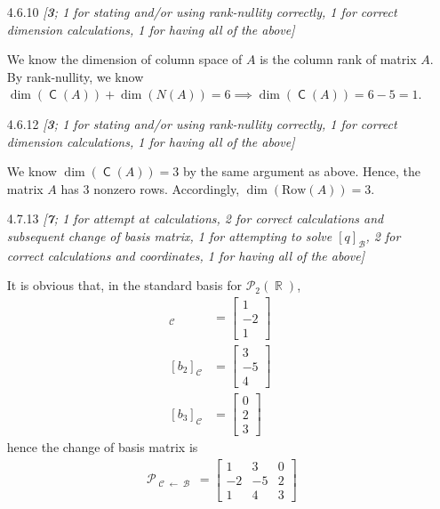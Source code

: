 \documentclass{amsart}
\theoremstyle{definition}
\theoremstyle{definition}
\DeclareMathOperator{\R}{\mathbb{R}}
\DeclareMathOperator{\1}{\mathbbm{1}}
\DeclareMathOperator{\powerset}{\mathcal{P}}
\DeclareMathOperator{\B}{\mathcal{B}}
\DeclareMathOperator{\CC}{\mathcal{C}}
\DeclareMathOperator{\col}{\mathsf{C}}
\newcommand{\polyn}[2]{\mathcal{P}_{#1}(#2)}
\begin{document}
\begin{enumerate}[itemsep = 2mm]
		
		\item[4.6.10] \textit{[\textbf{3}; 1 for stating and/or using rank-nullity correctly, 1 for correct dimension calculations, 1 for having all of the above]}
		
		We know the dimension of column space of $A$ is the column rank of matrix $A$. By rank-nullity, we know $\dim(\col(A)) + \dim(N(A)) = 6 \implies \dim(\col(A)) = 6 -5 = 1$.
		
		
		\item[4.6.12] \textit{[\textbf{3}; 1 for stating and/or using rank-nullity correctly, 1 for correct dimension calculations, 1 for having all of the above]}
		
		We know $\dim(\col(A)) = 3 $ by the same argument as above. Hence, the matrix $A$ has 3 nonzero rows. Accordingly, $\dim(\text{Row} (A)) = 3$.
		
		
		\item[4.7.13] \textit{[\textbf{7}; 1 for attempt at calculations, 2 for correct calculations and subsequent change of basis matrix, 1 for attempting to solve $[q]_{\B}$, 2 for correct calculations and coordinates, 1 for having all of the above]}
		
		It is obvious that, in the standard basis for $\polyn{2}{\R}$,
		\begin{align*}
		[b_1]_{\CC} &= \begin{bmatrix}
		1 \\ -2 \\ 1
		\end{bmatrix} \\
		[b_2]_{\CC} &= \begin{bmatrix}
		3 \\ -5 \\ 4
		\end{bmatrix} \\
		[b_3]_{\CC} &= \begin{bmatrix}
		0 \\ 2 \\ 3
		\end{bmatrix}
		\end{align*}
		hence the change of basis matrix is
		\begin{align*}
		\powerset_{\CC \leftarrow \B} = \begin{bmatrix}
		1 & 3 & 0 \\ -2 & -5 & 2 \\ 1 & 4 & 3
		\end{bmatrix}
		\end{align*}
		

\end{enumerate}
\end{document}
